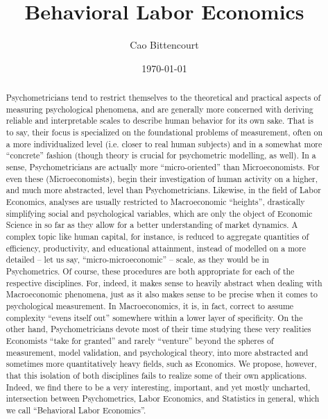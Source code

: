 \documentclass{elsarticle} %
\title{
    Behavioral Labor Economics
}
\author{Cao Bittencourt}
\affiliation{{B. Sc. in Economics from EPGE (FGV), RJ, Brazil.}}
\affiliation{{Statistician at Atlas Career Guide Inc., FL, USA.}}
\date{\today}
\begin{document}

\begin{abstract}
    \noindent
    Psychometricians tend to restrict themselves to the theoretical and practical aspects of measuring psychological phenomena, and are generally more concerned with deriving reliable and interpretable scales to describe human behavior for its own sake. That is to say, their focus is specialized on the foundational problems of measurement, often on a more individualized level (i.e. closer to real human subjects) and in a somewhat more ``concrete'' fashion (though theory is crucial for psychometric modelling, as well).
    In a sense, Psychometricians are actually more ``micro-oriented'' than Microeconomists. For even these (Microeconomists), begin their investigation of human activity on a higher, and much more abstracted, level than Psychometricians. Likewise, in the field of Labor Economics, analyses are usually restricted to Macroeconomic ``heights'', drastically simplifying social and psychological variables, which are only the object of Economic Science in so far as they allow for a better understanding of market dynamics. A complex topic like human capital, for instance, is reduced to aggregate quantities of efficiency, productivity, and educational attainment, instead of modelled on a more detailed -- let us say, ``micro-microeconomic'' -- scale, as they would be in Psychometrics.
    Of course, these procedures are both appropriate for each of the respective disciplines. For, indeed, it makes sense to heavily abstract when dealing with Macroeconomic phenomena, just as it also makes sense to be precise when it comes to psychological measurement. In Macroeconomics, it is, in fact, correct to assume complexity ``evens itself out'' somewhere within a lower layer of specificity. On the other hand, Psychometricians devote most of their time studying these very realities Economists ``take for granted'' and rarely ``venture'' beyond the spheres of measurement, model validation, and psychological theory, into more abstracted and sometimes more quantitatively heavy fields, such as Economics.
    We propose, however, that this isolation of both disciplines fails to realize some of their own applications. Indeed, we find there to be a very interesting, important, and yet mostly uncharted, intersection between Psychometrics, Labor Economics, and Statistics in general, which we call ``Behavioral Labor Economics''.
\end{abstract}

\maketitle

\end{document}
